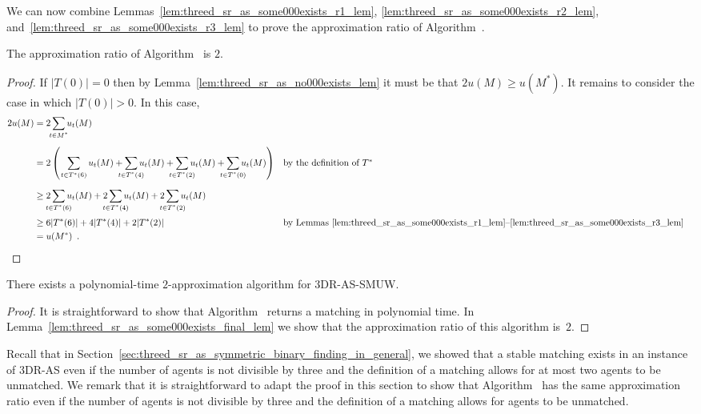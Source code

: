 We can now combine Lemmas~\ref{lem:threed_sr_as_some000exists_r1_lem}, \ref{lem:threed_sr_as_some000exists_r2_lem}, and~\ref{lem:threed_sr_as_some000exists_r3_lem} to prove the approximation ratio of Algorithm~.

\begin{lem}
\label{lem:threed_sr_as_some000exists_final_lem}
The approximation ratio of Algorithm~ is $2$.
\end{lem}
\begin{proof}
If $|T(0)| = 0$ then by Lemma~\ref{lem:threed_sr_as_no000exists_lem} it must be that $2u(M) \geq u(M^*)$. It remains to consider the case in which $|T(0)| > 0$. In this case, 
\begin{align*}
    2u(M) &= 2 \sum_{\mathclap{t\in M^*}} u_{t}(M)\\[0.5em]
    &= 2 \left( \hspace*{0.3mm} \sum_{t \in T^*(6)} u_{t}(M) + \sum_{\mathclap{t \in T^*(4)}} u_{t}(M)  + 
    \sum_{\mathclap{t \in T^*(2)}} u_{t}(M) + \sum_{\mathclap{t \in T^*(0)}} u_{t}(M) \right) && \mbox{by the definition of $T^*$}\\[0.6em]
    &\geq 2 \sum_{\mathclap{t \in T^*(6)}} u_{t}(M) + 2\sum_{\mathclap{t \in T^*(4)}} u_{t}(M)  + 
    2 \sum_{\mathclap{t \in T^*(2)}} u_{t}(M)\\[0.2em]
    &\geq 6|T^*(6)| + 4|T^*(4)| + 2|T^*(2)| && \mbox{by Lemmas~\ref{lem:threed_sr_as_some000exists_r1_lem}--\ref{lem:threed_sr_as_some000exists_r3_lem}}\\
    &= u(M^*)\enspace.
\end{align*}
\end{proof}

\begin{thm}
\label{thm:threed_sr_as_approxratio}
There exists a polynomial-time $2$-approximation algorithm for 3DR-AS-SMUW.
\end{thm}
\begin{proof}
It is straightforward to show that Algorithm~ returns a matching in polynomial time. In Lemma~\ref{lem:threed_sr_as_some000exists_final_lem} we show that the approximation ratio of this algorithm is~$2$.
\end{proof}

Recall that in Section~\ref{sec:threed_sr_as_symmetric_binary_finding_in_general}, we showed that a stable matching exists in an instance of 3DR-AS even if the number of agents is not divisible by three and the definition of a matching allows for at most two agents to be unmatched. We remark that it is straightforward to adapt the proof in this section to show that Algorithm~ has the same approximation ratio even if the number of agents is not divisible by three and the definition of a matching allows for agents to be unmatched.

